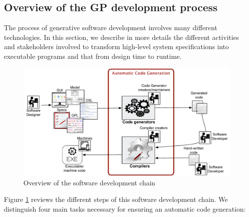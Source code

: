 \subsection{Overview of the GP development process}
The process of generative software development involves many different technologies. In this section, we describe in more details the different activities and stakeholders involved to transform high-level system specifications into executable programs and that from design time to runtime.
\begin{figure}[h]
	\center
	\includegraphics[scale=0.65]{Background/fig/background_overview2.pdf}
	\caption{Overview of the software development chain}
	\label{fig:background_overview2}
\end{figure}
Figure \ref{fig:background_overview2} reviews the different steps of this software development chain. We distinguish four main tasks necessary for ensuring an automatic code generation: 



